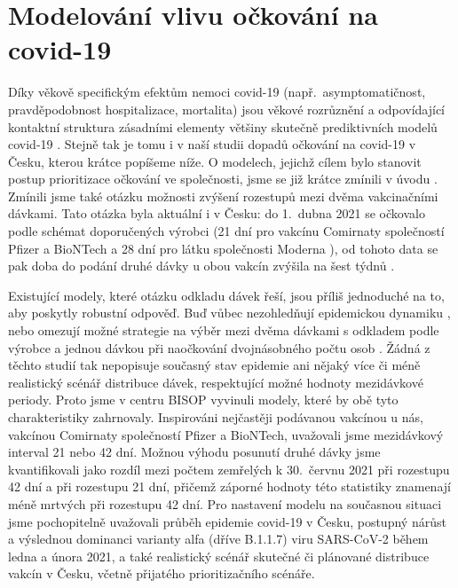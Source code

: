 \section*{Modelování vlivu očkování na covid-19}

Díky věkově specifickým efektům nemoci covid-19 (např.\ asymptomatičnost, pravděpodobnost hospitalizace, mortalita) jsou věkové rozrůznění a odpovídající kontaktní struktura zásadními elementy většiny skutečně prediktivních modelů covid-19 \cite[a mnoho dalších]{Davies_etal2020,Bubar_etal2021,Moore_etal2021,Rozhnova_etal2021}. Stejně tak je tomu i v naší studii dopadů očkování na covid-19 v Česku, kterou krátce popíšeme níže. O modelech, jejichž cílem bylo stanovit postup prioritizace očkování ve společnosti, jsme se již krátce zmínili v úvodu \cite{Bubar_etal2021,Moore_etal2021b}. Zmínili jsme také otázku možnosti zvýšení rozestupů mezi dvěma vakcinačními dávkami. Tato otázka byla aktuální i v Česku: do 1.\ dubna 2021 se očkovalo podle schémat doporučených výrobci (21 dní pro vakcínu Comirnaty společností Pfizer a BioNTech a 28 dní pro látku společnosti Moderna \cite{original_delay}), od tohoto data se pak doba do podání druhé dávky u obou vakcín zvýšila na šest týdnů \cite{new_delay}.

Existující modely, které otázku odkladu dávek řeší, jsou příliš jednoduché na to, aby poskytly robustní odpověď. Buď vůbec nezohledňují epidemickou dynamiku \cite{Tuite_etal2021}, nebo omezují možné strategie na výběr mezi dvěma dávkami s odkladem podle výrobce a jednou dávkou při naočkování dvojnásobného počtu osob \cite{Paltiel_etal2021}. Žádná z těchto studií tak nepopisuje současný stav epidemie ani nějaký více či méně realistický scénář distribuce dávek, respektující možné hodnoty mezidávkové periody. Proto jsme v centru BISOP vyvinuli modely, které by obě tyto charakteristiky zahrnovaly. Inspirováni nejčastěji podávanou vakcínou u nás, vakcínou Comirnaty společností Pfizer a BioNTech, uvažovali jsme mezidávkový interval 21 nebo 42 dní. Možnou výhodu posunutí druhé dávky jsme kvantifikovali jako rozdíl mezi počtem zemřelých k 30.\ červnu 2021 při rozestupu 42 dní a při rozestupu 21 dní, přičemž záporné hodnoty této statistiky znamenají méně mrtvých při rozestupu 42 dní. Pro nastavení modelu na současnou situaci jsme pochopitelně uvažovali průběh epidemie covid-19 v Česku, postupný nárůst a výslednou dominanci varianty alfa (dříve B.1.1.7) viru SARS-CoV-2 během ledna a února 2021, a také realistický scénář skutečné či plánované distribuce vakcín v Česku, včetně přijatého prioritizačního scénáře. 

